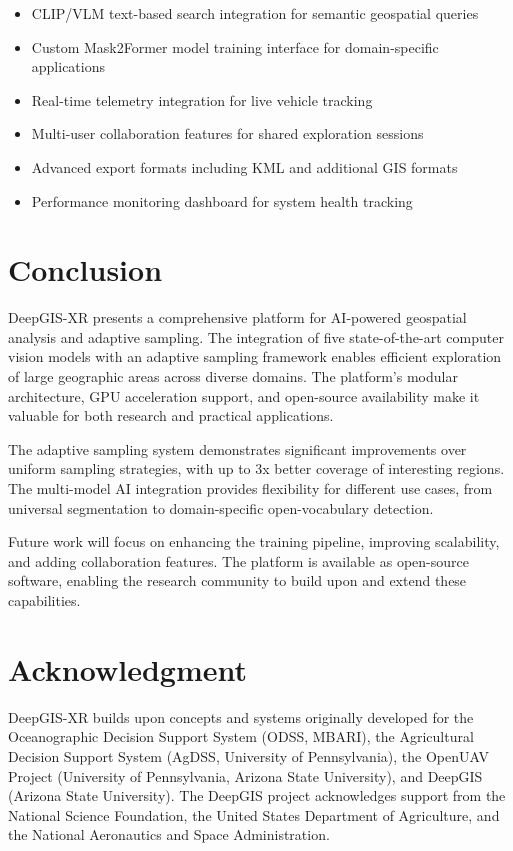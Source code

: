 \documentclass[conference]{IEEEtran}
\begin{document}
\begin{itemize}
    \item CLIP/VLM text-based search integration for semantic geospatial queries
    \item Custom Mask2Former model training interface for domain-specific applications
    \item Real-time telemetry integration for live vehicle tracking
    \item Multi-user collaboration features for shared exploration sessions
    \item Advanced export formats including KML and additional GIS formats
    \item Performance monitoring dashboard for system health tracking
\end{itemize}

\section{Conclusion}

DeepGIS-XR presents a comprehensive platform for AI-powered geospatial analysis and adaptive sampling. The integration of five state-of-the-art computer vision models with an adaptive sampling framework enables efficient exploration of large geographic areas across diverse domains. The platform's modular architecture, GPU acceleration support, and open-source availability make it valuable for both research and practical applications.

The adaptive sampling system demonstrates significant improvements over uniform sampling strategies, with up to 3x better coverage of interesting regions. The multi-model AI integration provides flexibility for different use cases, from universal segmentation to domain-specific open-vocabulary detection.

Future work will focus on enhancing the training pipeline, improving scalability, and adding collaboration features. The platform is available as open-source software, enabling the research community to build upon and extend these capabilities.

\section*{Acknowledgment}

DeepGIS-XR builds upon concepts and systems originally developed for the Oceanographic Decision Support System (ODSS, MBARI), the Agricultural Decision Support System (AgDSS, University of Pennsylvania), the OpenUAV Project (University of Pennsylvania, Arizona State University), and DeepGIS (Arizona State University). The DeepGIS project acknowledges support from the National Science Foundation, the United States Department of Agriculture, and the National Aeronautics and Space Administration.
\end{document}

